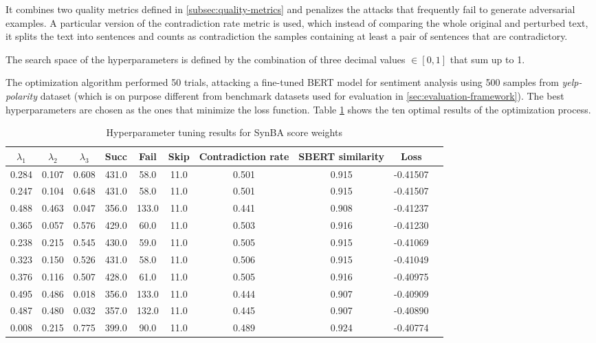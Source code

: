 It combines two quality metrics defined in \ref{subsec:quality-metrics} and penalizes the attacks that frequently fail to generate adversarial examples.
A particular version of the contradiction rate metric is used, which instead of comparing the whole original and perturbed text, it splits the text into sentences and counts as contradiction the samples containing at least a pair of sentences that are contradictory.

The search space of the hyperparameters is defined by the combination of three decimal values $\in [0, 1]$ that sum up to 1.

The optimization algorithm performed 50 trials, attacking a fine-tuned BERT model for sentiment analysis using 500 samples from \emph{yelp-polarity} \cite{zhang2015characterlevel} dataset (which is on purpose different from benchmark datasets used for evaluation in \ref{sec:evaluation-framework}).
The best hyperparameters are chosen as the ones that minimize the loss function.
Table \ref{tab:3_5_hyperparameter_tuning} shows the ten optimal results of the optimization process.

\begin{table}[h]
    \footnotesize
    \centering
    \begin{tabular}{|c|c|c|c|c|c|c|c|c|c|}
        \hline
        $\lambda_1$ & $\lambda_2$ & $\lambda_3$ &  Succ &  Fail &  Skip &  Contradiction rate &  SBERT similarity &  Loss \\
        \hline
        \hline
        0.284 & 0.107 & 0.608 & 431.0 &  58.0 &  11.0 &  0.501 &  0.915 &  -0.41507 \\
        0.247 & 0.104 & 0.648 & 431.0 &  58.0 &  11.0 &  0.501 &  0.915 &  -0.41507 \\
        0.488 & 0.463 & 0.047 & 356.0 & 133.0 &  11.0 &  0.441 &  0.908 &  -0.41237 \\
        0.365 & 0.057 & 0.576 & 429.0 &  60.0 &  11.0 &  0.503 &  0.916 &  -0.41230 \\
        0.238 & 0.215 & 0.545 & 430.0 &  59.0 &  11.0 &  0.505 &  0.915 &  -0.41069 \\
        0.323 & 0.150 & 0.526 & 431.0 &  58.0 &  11.0 &  0.506 &  0.915 &  -0.41049 \\
        0.376 & 0.116 & 0.507 & 428.0 &  61.0 &  11.0 &  0.505 &  0.916 &  -0.40975 \\
        0.495 & 0.486 & 0.018 & 356.0 & 133.0 &  11.0 &  0.444 &  0.907 &  -0.40909 \\
        0.487 & 0.480 & 0.032 & 357.0 & 132.0 &  11.0 &  0.445 &  0.907 &  -0.40890 \\
        0.008 & 0.215 & 0.775 & 399.0 &  90.0 &  11.0 &  0.489 &  0.924 &  -0.40774 \\
        \hline
    \end{tabular}
\caption{Hyperparameter tuning results for SynBA score weights}
\label{tab:3_5_hyperparameter_tuning}
\end{table}

